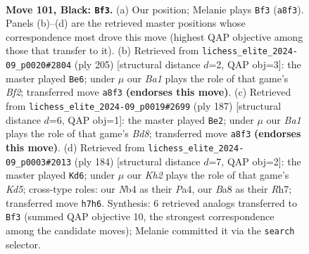 \documentclass[11pt]{article}
\begin{document}
\clearpage

\begin{figure}[p]\centering
\begin{subfigure}{0.46\textwidth}\centering
\resizebox{\linewidth}{!}{%
\newchessgame
\chessboard[
  setfen={b7/7k/8/8/1n1B4/8/5P1K/8 b - - 48 101},
  showmover=false,
  pgfstyle=straightmove, color=movearrow, markmove={a8-f3}
]}
\caption{}
\end{subfigure}\hfill
\begin{subfigure}{0.46\textwidth}\centering
\resizebox{\linewidth}{!}{%
\newchessgame
\chessboard[
  setfen={8/5b2/5P2/8/3B4/8/3k4/1K6 b - - 20 103},
  showmover=false,
  pgfstyle=straightmove, color=movearrow, markmove={f7-e6}
]}
\caption{}
\end{subfigure}
\\[4pt]
\begin{subfigure}{0.46\textwidth}\centering
\resizebox{\linewidth}{!}{%
\newchessgame
\chessboard[
  setfen={6B1/8/8/8/3k4/P7/1K6/3b4 b - - 10 94},
  showmover=false,
  pgfstyle=straightmove, color=movearrow, markmove={d1-e2}
]}
\caption{}
\end{subfigure}\hfill
\begin{subfigure}{0.46\textwidth}\centering
\resizebox{\linewidth}{!}{%
\newchessgame
\chessboard[
  setfen={3k4/7R/8/p2K4/P7/8/3b4/8 w - - 48 93},
  showmover=false,
  pgfstyle=straightmove, color=movearrow, markmove={d5-d6}
]}
\caption{}
\end{subfigure}
\caption{\textbf{Move 101, Black: \texttt{Bf3}.} (a) Our position; Melanie plays \texttt{Bf3} (\texttt{a8f3}). Panels (b)--(d) are the retrieved master positions whose correspondence most drove this move (highest QAP objective among those that transfer to it). (b) Retrieved from \texttt{lichess\_elite\_2024-09\_p0020\#2804} (ply 205) [structural distance $d$=2, QAP obj=3]: the master played \texttt{Be6}; under $\mu$ our \emph{Ba1} plays the role of that game's \emph{Bf2}; transferred move \texttt{a8f3} \textbf{(endorses this move)}. (c) Retrieved from \texttt{lichess\_elite\_2024-09\_p0019\#2699} (ply 187) [structural distance $d$=6, QAP obj=1]: the master played \texttt{Be2}; under $\mu$ our \emph{Ba1} plays the role of that game's \emph{Bd8}; transferred move \texttt{a8f3} \textbf{(endorses this move)}. (d) Retrieved from \texttt{lichess\_elite\_2024-09\_p0003\#2013} (ply 184) [structural distance $d$=7, QAP obj=2]: the master played \texttt{Kd6}; under $\mu$ our \emph{Kh2} plays the role of that game's \emph{Kd5}; cross-type roles: our \emph{N}b4 as their \emph{P}a4, our \emph{B}a8 as their \emph{R}h7; transferred move \texttt{h7h6}. Synthesis: 6 retrieved analogs transferred to \texttt{Bf3} (summed QAP objective 10, the strongest correspondence among the candidate moves); Melanie committed it via the \texttt{search} selector.}
\label{fig:thought-m201}
\end{figure}
\end{document}
